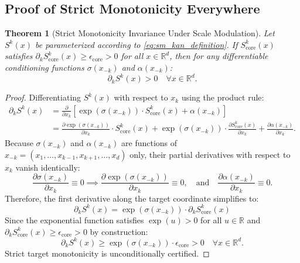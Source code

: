 \documentclass[11pt,a4paper]{article}
\theoremstyle{plain}
\newtheorem{theorem}{Theorem}[section]
\theoremstyle{definition}
\theoremstyle{remark}
\begin{document}
\subsection{Proof of Strict Monotonicity Everywhere}

\begin{theorem}[Strict Monotonicity Invariance Under Scale Modulation]
Let $S^k(x)$ be parameterized according to \eqref{eq:sm_kan_definition}. If $S^k_{\text{core}}(x)$ satisfies $\partial_k S^k_{\text{core}}(x) \ge \epsilon_{\text{core}} > 0$ for all $x \in \mathbb{R}^d$, then for any differentiable conditioning functions $\sigma(x_{-k})$ and $\alpha(x_{-k})$:
\begin{equation}
    \partial_k S^k(x) > 0 \quad \forall x \in \mathbb{R}^d.
\end{equation}
\end{theorem}

\begin{proof}
Differentiating $S^k(x)$ with respect to $x_k$ using the product rule:
\begin{align}
    \partial_k S^k(x) &= \frac{\partial}{\partial x_k} \left[ \exp\left( \sigma(x_{-k}) \right) \cdot S^k_{\text{core}}(x) + \alpha(x_{-k}) \right] \nonumber \\
    &= \frac{\partial \exp(\sigma(x_{-k}))}{\partial x_k} \cdot S^k_{\text{core}}(x) + \exp(\sigma(x_{-k})) \cdot \frac{\partial S^k_{\text{core}}(x)}{\partial x_k} + \frac{\partial \alpha(x_{-k})}{\partial x_k}.
\end{align}
Because $\sigma(x_{-k})$ and $\alpha(x_{-k})$ are functions of $x_{-k} = (x_1, \dots, x_{k-1}, x_{k+1}, \dots, x_d)$ only, their partial derivatives with respect to $x_k$ vanish identically:
\begin{equation}
    \frac{\partial \sigma(x_{-k})}{\partial x_k} \equiv 0 \implies \frac{\partial \exp(\sigma(x_{-k}))}{\partial x_k} \equiv 0, \quad \text{and} \quad \frac{\partial \alpha(x_{-k})}{\partial x_k} \equiv 0.
\end{equation}
Therefore, the first derivative along the target coordinate simplifies to:
\begin{equation}
    \boxed{\partial_k S^k(x) = \exp\left( \sigma(x_{-k}) \right) \cdot \partial_k S^k_{\text{core}}(x)}
    \label{eq:sm_target_derivative}
\end{equation}
Since the exponential function satisfies $\exp(u) > 0$ for all $u \in \mathbb{R}$ and $\partial_k S^k_{\text{core}}(x) \ge \epsilon_{\text{core}} > 0$ by construction:
\begin{equation}
    \partial_k S^k(x) \ge \exp\left(\sigma(x_{-k})\right) \cdot \epsilon_{\text{core}} > 0 \quad \forall x \in \mathbb{R}^d.
\end{equation}
Strict target monotonicity is unconditionally certified.
\end{proof}
\end{document}
